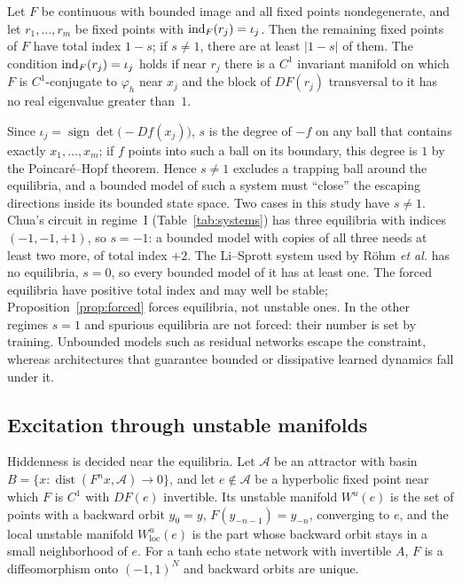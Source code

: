 \begin{proposition}
\label{prop:forced}
Let $F$ be continuous with bounded image and all fixed points nondegenerate, and let $r_1,\dots,r_m$ be fixed points with
$\operatorname{ind}_F(r_j)=\iota_j$. Then the remaining fixed points of $F$ have total index $1-s$; if $s\neq1$, there are at least $|1-s|$
of them. The condition $\operatorname{ind}_F(r_j)=\iota_j$ holds if near $r_j$ there is a $C^1$ invariant manifold on which $F$ is
$C^1$-conjugate to $\varphi_h$ near $x_j$ and the block of $DF(r_j)$ transversal to it has no real eigenvalue greater
than~$1$.
\end{proposition}

Since $\iota_j=\operatorname{sign}\det\bigl(-Df(x_j)\bigr)$, $s$ is the degree of $-f$ on any ball that contains exactly
$x_1,\dots,x_m$; if $f$ points into such a ball on its boundary, this degree is $1$ by the Poincar\'e--Hopf theorem. Hence
$s\neq1$ excludes a trapping ball around the equilibria, and a bounded model of such a system must ``close'' the escaping
directions inside its bounded state space. Two cases in this study have $s\neq1$. Chua's circuit in regime~I
(Table~\ref{tab:systems}) has three equilibria with indices $(-1,-1,+1)$, so $s=-1$: a bounded model with copies of all
three needs at least two more, of total index $+2$. The Li--Sprott system used by R\"ohm \textit{et al.}\cite{Rohm2021} has
no equilibria, $s=0$, so every bounded model of it has at least one. The forced equilibria have positive total index and
may well be stable; Proposition~\ref{prop:forced} forces equilibria, not unstable ones. In the other regimes $s=1$ and
spurious equilibria are not forced: their number is set by training. Unbounded models such as residual networks escape
the constraint, whereas architectures that guarantee bounded or dissipative learned
dynamics\cite{Kaptanoglu2021Trapping,Li2022Dissipative,Linot2023Stabilized,Tang2026Dissipative} fall under it.

\subsection{Excitation through unstable manifolds}
\label{sec:manifold}

Hiddenness is decided near the equilibria. Let $\mathcal{A}$ be an attractor with basin
$B=\{x:\operatorname{dist}(F^nx,\mathcal{A})\to0\}$, and let $e\notin\mathcal{A}$ be a hyperbolic fixed point near which $F$
is $C^1$ with $DF(e)$ invertible. Its unstable manifold $W^u(e)$ is the set of points with a backward orbit
$y_0=y$, $F(y_{-n-1})=y_{-n}$, converging to $e$, and the local unstable manifold $W^u_{\mathrm{loc}}(e)$ is the part whose
backward orbit stays in a small neighborhood of $e$. For a tanh echo state network with invertible $A$, $F$ is a
diffeomorphism onto $(-1,1)^N$ and backward orbits are unique.

